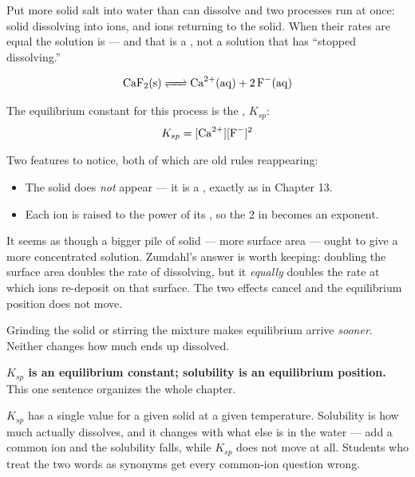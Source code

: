\documentclass{apchem-notes}
\begin{document}


Put more solid salt into water than can dissolve and two processes run at
once: solid dissolving into ions, and ions returning to the solid. When
their rates are equal the solution is  --- and that is a
, not a solution that has ``stopped
dissolving.''

\[ \ce{CaF2(s) <=> Ca^2+(aq) + 2F^-(aq)} \]

The equilibrium constant for this process is the ,
$K_{sp}$:
\[ K_{sp} = [\ce{Ca^2+}][\ce{F^-}]^2 \]

Two features to notice, both of which are old rules reappearing:

\begin{itemize}[leftmargin=*,itemsep=0.3em]
  \item The solid does \emph{not} appear --- it is a
        , exactly as in Chapter 13.
  \item Each ion is raised to the power of its
        , so the 2 in  becomes an
        exponent.
\end{itemize}

\begin{apcnote}
It seems as though a bigger pile of solid --- more surface area --- ought to
give a more concentrated solution. Zumdahl's answer is worth keeping:
doubling the surface area doubles the rate of dissolving, but it
\emph{equally} doubles the rate at which ions re-deposit on that surface.
The two effects cancel and the equilibrium position does not move.

Grinding the solid or stirring the mixture makes equilibrium arrive
\emph{sooner}. Neither changes how much ends up dissolved.
\end{apcnote}

\begin{apctrap}
\textbf{$K_{sp}$ is an equilibrium constant; solubility is an equilibrium
position.} This one sentence organizes the whole chapter.

$K_{sp}$ has a single value for a given solid at a given temperature.
Solubility is how much actually dissolves, and it changes with what else is
in the water --- add a common ion and the solubility falls, while $K_{sp}$
does not move at all. Students who treat the two words as synonyms get
every common-ion question wrong.
\end{apctrap}
\end{document}
